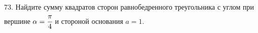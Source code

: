 73. Найдите сумму квадратов сторон равнобедренного треугольника с углом при вершине $\alpha=\cfrac{\pi}{4}$ и стороной основания $a=1.$\\
